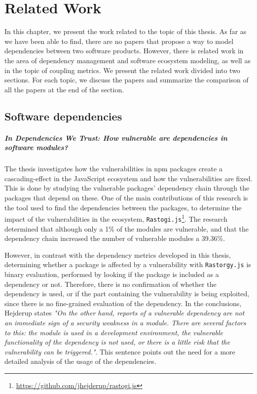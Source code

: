 \chapter{Related Work}\label{ch:RelatedWork}
In this chapter, we present the work related to the topic of this thesis.
As far as we have been able to find, there are no papers that propose a way to model dependencies between two software products. However, there is related work in the area of dependency management and software ecosystem modeling, as well as in the topic of coupling metrics. We present the related work divided into two sections. For each topic, we discuss the papers and summarize the comparison of all the papers at the end of the section.

\section{Software dependencies}

\paragraph{In Dependencies We Trust: How vulnerable are dependencies in software modules? \cite{hejderup2015dependencies}}
The thesis investigates how the vulnerabilities in npm packages create a cascading-effect in the JavaScript ecosystem and how the vulnerabilities are fixed. This is done by studying the vulnerable packages' dependency chain through the packages that depend on these. One of the main contributions of this research is the tool used to find the dependencies between the packages, to determine the impact of the vulnerabilities in the ecosystem, \texttt{Rastogi.js}\footnote{\href{https://github.com/jhejderup/rastogi.js}{https://github.com/jhejderup/rastogi.js}}. The research determined that although only a 1\% of the modules are vulnerable, and that the dependency chain increased the number of vulnerable modules a 39.36\%.

However, in contrast with the dependency metrics developed in this thesis, determining whether a package is affected by a vulnerability with \texttt{Rastorgy.js} is binary evaluation, performed by looking if the package is included as a dependency or not. Therefore, there is no confirmation of whether the dependency is used, or if the part containing the vulnerability is being exploited, since there is no fine-grained evaluation of the dependency. In the conclusions, Hejderup states \textit{"On the other hand, reports of a vulnerable dependency are not an immediate sign of a security weakness in a module. There are several factors to this: the module is used in a development environment, the vulnerable functionality of the dependency is not used, or there is a little risk that the vulnerability can be triggered."}. This sentence points out the need for a more detailed analysis of the usage of the dependencies.

